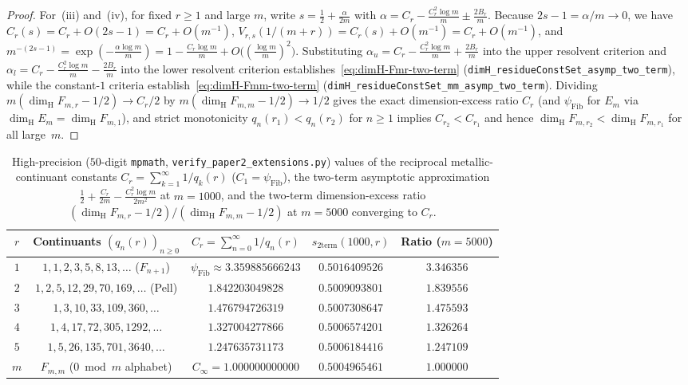 \documentclass[11pt]{article}
\theoremstyle{definition}
\theoremstyle{remark}
\newcommand{\dimH}{\dim_{\mathrm{H}}}
\begin{document}
\begin{proof}
For~(iii) and~(iv), for fixed $r\ge1$ and large $m$, write $s=\frac12+\frac{\alpha}{2m}$
with $\alpha=C_r-\frac{C_r^2\log m}{m}\pm\frac{2B_r}{m}$. Because $2s-1=\alpha/m\to0$,
we have $C_r(s)=C_r+O(2s-1)=C_r+O(m^{-1})$,
$V_{r,s}(1/(m+r))=C_r(s)+O(m^{-1})=C_r+O(m^{-1})$, and
$m^{-(2s-1)}=\exp(-\frac{\alpha\log m}{m})=1-\frac{C_r\log m}{m}+O\bigl((\frac{\log m}{m})^2\bigr)$.
Substituting $\alpha_u=C_r-\frac{C_r^2\log m}{m}+\frac{2B_r}{m}$ into the upper
resolvent criterion and $\alpha_l=C_r-\frac{C_r^2\log m}{m}-\frac{2B_r}{m}$ into the
lower resolvent criterion establishes~\eqref{eq:dimH-Fmr-two-term}
(\texttt{dimH\_\allowbreak residueConstSet\_\allowbreak asymp\_\allowbreak two\_\allowbreak term}),
while the constant-$1$ criteria establish~\eqref{eq:dimH-Fmm-two-term}
(\texttt{dimH\_\allowbreak residueConstSet\_\allowbreak mm\_\allowbreak asymp\_\allowbreak two\_\allowbreak term}).
Dividing $m(\dimH F_{m,r}-1/2)\to C_r/2$ by $m(\dimH F_{m,m}-1/2)\to 1/2$ gives the
exact dimension-excess ratio $C_r$ (and $\psi_{\mathrm{Fib}}$ for $E_m$ via
$\dimH E_m=\dimH F_{m,1}$), and strict monotonicity $q_n(r_1)<q_n(r_2)$ for $n\ge1$
implies $C_{r_2}<C_{r_1}$ and hence $\dimH F_{m,r_2}<\dimH F_{m,r_1}$ for all large~$m$.
\end{proof}

\begin{table}[ht]
\centering\small
\begin{tabular}{c|c|c|c|c}
$r$ & Continuants $(q_n(r))_{n\ge0}$ & $C_r=\sum_{n=0}^\infty 1/q_n(r)$ & $s_{\mathrm{2term}}(1000,r)$ & Ratio ($m=5000$) \\\hline
$1$ & $1,1,2,3,5,8,13,\dots$ ($F_{n+1}$) & $\psi_{\mathrm{Fib}}\approx 3.359885666243$ & $0.5016409526$ & $3.346356$ \\
$2$ & $1,2,5,12,29,70,169,\dots$ (Pell) & $1.842203049828$ & $0.5009093801$ & $1.839556$ \\
$3$ & $1,3,10,33,109,360,\dots$ & $1.476794726319$ & $0.5007308647$ & $1.475593$ \\
$4$ & $1,4,17,72,305,1292,\dots$ & $1.327004277866$ & $0.5006574201$ & $1.326264$ \\
$5$ & $1,5,26,135,701,3640,\dots$ & $1.247635731173$ & $0.5006184416$ & $1.247109$ \\\hline
$m$ & $F_{m,m}$ ($0\bmod m$ alphabet) & $C_\infty=1.000000000000$ & $0.5004965461$ & $1.000000$
\end{tabular}
\caption{High-precision ($50$-digit \texttt{mpmath}, \texttt{verify\_\allowbreak paper2\_\allowbreak extensions.py}) values of the reciprocal metallic-continuant constants $C_r=\sum_{k=1}^\infty 1/q_k(r)$ ($C_1=\psi_{\mathrm{Fib}}$), the two-term asymptotic approximation $\frac12+\frac{C_r}{2m}-\frac{C_r^2\log m}{2m^2}$ at $m=1000$, and the two-term dimension-excess ratio $(\dimH F_{m,r}-1/2)/(\dimH F_{m,m}-1/2)$ at $m=5000$ converging to $C_r$.}\label{tab:residues-asymptotic}
\end{table}
\end{document}
